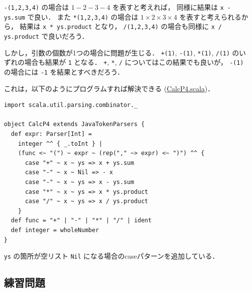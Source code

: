 \documentclass[a4j]{jsarticle}
\begin{document}
\texttt{-(1,2,3,4)} の場合は $1-2-3-4$ を表すと考えれば，
同様に結果は \texttt{x - ys.sum} で良い．
また \texttt{*(1,2,3,4)} の場合は $1\times 2\times 3\times 4$ を表すと考えられるから，
結果は \texttt{x * ys.product} となり，
\texttt{/(1,2,3,4)} の場合も同様に \texttt{x / ys.product} で良いだろう．

しかし，引数の個数が1つの場合に問題が生じる．
\texttt{+(1)}, \texttt{-(1)}, \texttt{*(1)}, \texttt{/(1)} のいずれの場合も結果が \texttt{1} となる．
\texttt{+}, \texttt{*}, \texttt{/} についてはこの結果でも良いが，
\texttt{-(1)} の場合には \texttt{-1} を結果とすべきだろう．

これは，以下のようにプログラムすれば解決できる
(\href{file:///home/tamura/lect2/ProLang/2018/org/prog/parser/CalcP4.scala}{CalcP4.scala})．


\begin{verbatim}
import scala.util.parsing.combinator._

object CalcP4 extends JavaTokenParsers {
  def expr: Parser[Int] =
    integer ^^ { _.toInt } |
    (func <~ "(") ~ expr ~ (rep("," ~> expr) <~ ")") ^^ {
      case "+" ~ x ~ ys => x + ys.sum
      case "-" ~ x ~ Nil => - x
      case "-" ~ x ~ ys => x - ys.sum
      case "*" ~ x ~ ys => x * ys.product
      case "/" ~ x ~ ys => x / ys.product
    }
  def func = "+" | "-" | "*" | "/" | ident
  def integer = wholeNumber
}
\end{verbatim}

\texttt{ys} の箇所が空リスト \texttt{Nil} になる場合のcaseパターンを追加している．
\subsection{練習問題}
\label{sec-4-6}
\end{document}
